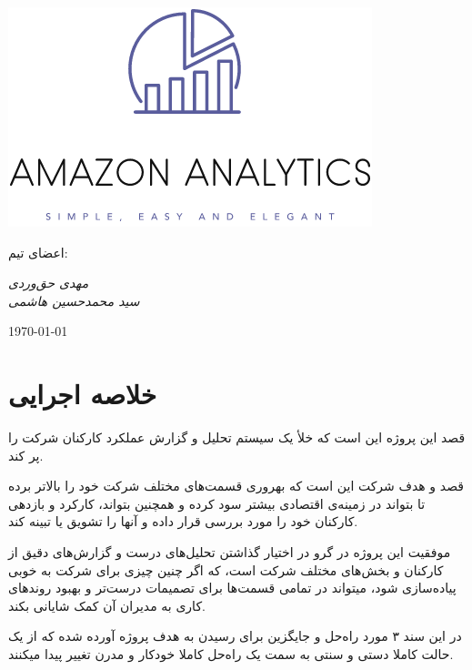 \documentclass[12pt, dvipsnames, svgnames, x11names,]{article}
\begin{document}
\begin{titlepage}
\centering
\vspace{1cm}
{\Huge {}\par}
\vspace{15mm}
\includegraphics{../images/alogo} \par

\vfill \par	\vfill

{\small        اعضای تیم: \par    
\itshape                مهدی حق‌وردی\\            سید محمدحسین هاشمی \par}
\vspace{5cm}
{\large \today\par}
\end{titlepage}
\tableofcontents
\newpage

\section{خلاصه اجرایی}

قصد این پروژه این است که خلأ یک سیستم تحلیل و گزارش عملکرد کارکنان شرکت 
را پر کند. 

قصد و هدف شرکت 
این است که بهروری قسمت‌های مختلف شرکت‌ خود را بالاتر برده تا بتواند در زمینه‌ی اقتصادی بیشتر سود کرده و همچنین بتواند، کارکرد و بازدهی کارکنان خود را مورد بررسی قرار داده و آنها را تشویق یا تبینه کند.

موفقیت این پروژه در گرو در اختیار‌ گذاشتن تحلیل‌های درست و گزارش‌های دقیق از کارکنان و بخش‌های مختلف شرکت است، که اگر چنین چیزی برای شرکت 
به خوبی پیاده‌سازی شود، میتواند در تمامی قسمت‌ها برای تصمیمات درست‌تر و بهبود روند‌های کاری به مدیران آن کمک شایانی بکند.

در این سند ۳ مورد راه‌حل و جایگزین برای رسیدن به هدف پروژه آورده شده که از یک حالت کاملا دستی و سنتی به سمت یک راه‌حل کاملا خودکار و مدرن تغییر پیدا میکنند.
\end{document}
